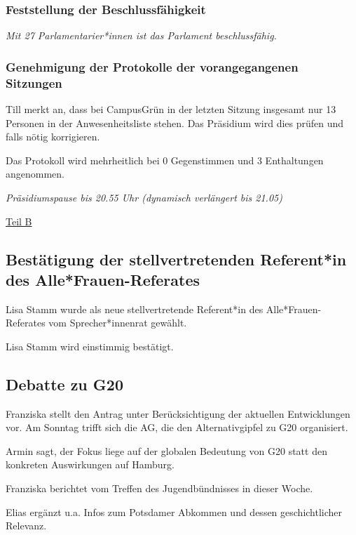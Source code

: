\documentclass[ngerman,headheight=70pt]{scrartcl}
\begin{document}
    \subsubsection{Feststellung der Beschlussfähigkeit}

    \textit{Mit 27 Parlamentarier*innen ist das Parlament beschlussfähig.}

    \subsubsection{Genehmigung der Protokolle der vorangegangenen Sitzungen}

    Till merkt an, dass bei CampusGrün in der letzten Sitzung insgesamt nur 13
    Personen in der Anwesenheitsliste stehen. Das Präsidium wird dies prüfen
    und falls nötig korrigieren.

    Das Protokoll wird mehrheitlich bei 0 Gegenstimmen und 3 Enthaltungen
    angenommen.

    \textit{Präsidiumspause bis 20.55 Uhr (dynamisch verlängert bis 21.05)}

    \vspace{0.5cm}
    {\Large \underline{Teil B}}

    \subsection{Bestätigung der stellvertretenden Referent*in des Alle*Frauen-Referates}

    Lisa Stamm wurde als neue stellvertretende Referent*in des Alle*Frauen-Referates
    vom Sprecher*innenrat gewählt.

    Lisa Stamm wird einstimmig bestätigt.

    \subsection{Debatte zu G20}

    Franziska stellt den Antrag unter Berücksichtigung der aktuellen Entwicklungen
    vor. Am Sonntag trifft sich die AG, die den Alternativgipfel zu G20 organisiert.

    Armin sagt, der Fokus liege auf der globalen Bedeutung von G20 statt den konkreten
    Auswirkungen auf Hamburg.

    Franziska berichtet vom Treffen des Jugendbündnisses in dieser Woche.

    Elias ergänzt u.a. Infos zum Potsdamer Abkommen und dessen geschichtlicher
    Relevanz.
\end{document}
